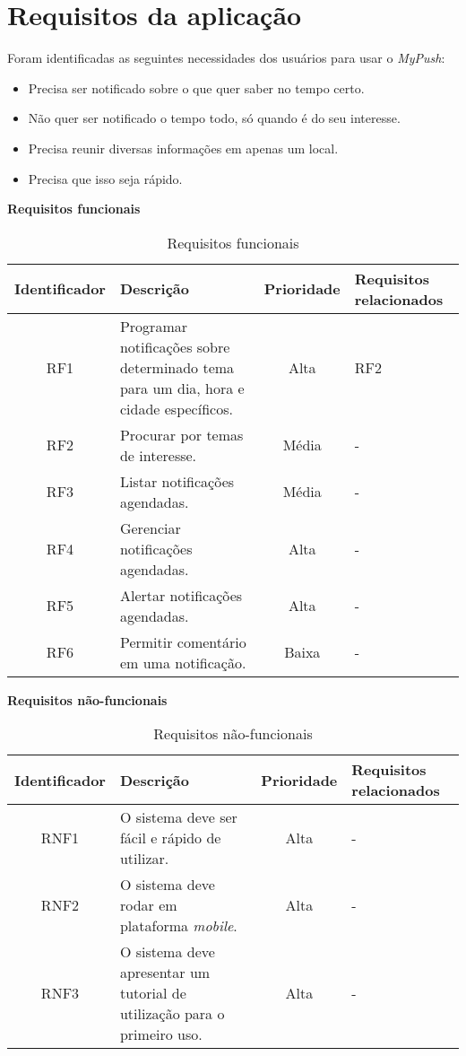 \chapter{Requisitos da aplicação}

Foram identificadas as seguintes necessidades dos usuários para usar o \textit{MyPush}:

\begin{itemize}
 \item Precisa ser notificado sobre o que quer saber no tempo certo.
 \item Não quer ser notificado o tempo todo, só quando é do seu interesse.
 \item Precisa reunir diversas informações em apenas um local.
 \item Precisa que isso seja rápido.
\end{itemize}

\textbf{Requisitos funcionais}

\begin{table}[h]
\centering
  \begin{tabular}{|c|m{6cm}|c|m{2.6cm}|}

  \hline
  \textbf{Identificador} & \textbf{Descrição} & \textbf{Prioridade} & \textbf{Requisitos relacionados}\\
  \hline                               
  RF1 & Programar notificações sobre determinado tema para um dia, hora e cidade específicos. & Alta & RF2\\
  \hline
  RF2 & Procurar por temas de interesse. & Média & -\\
  \hline
  RF3 & Listar notificações agendadas. & Média & -\\
  \hline
  RF4 & Gerenciar notificações agendadas. & Alta & -\\
  \hline
  RF5 & Alertar notificações agendadas. & Alta & -\\
  \hline
  RF6 & Permitir comentário em uma notificação. & Baixa & -\\
  \hline
  \end{tabular}
  \caption[Requisitos funcionais]{Requisitos funcionais}
\end{table}

\textbf{Requisitos não-funcionais}

\begin{table}[h]
  \centering
  \begin{tabular}{|c|m{6cm}|c|m{2.6cm}|}

  \hline
  \textbf{Identificador} & \textbf{Descrição} & \textbf{Prioridade} & \textbf{Requisitos relacionados}\\
  \hline                               
  RNF1 & O sistema deve ser fácil e rápido de utilizar. & Alta & -\\
  \hline
  RNF2 & O sistema deve rodar em plataforma \textit{mobile}. & Alta & -\\
  \hline
  RNF3 & O sistema deve apresentar um tutorial de utilização para o primeiro uso. & Alta & -\\
  \hline
  \end{tabular}
  \caption[Requisitos não-funcionais]{Requisitos não-funcionais}
\end{table}